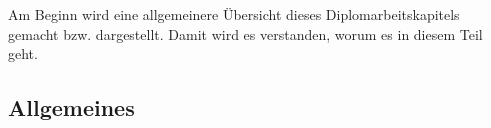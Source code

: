 \chapter{\docname}
\label{\docname}
Am Beginn wird eine allgemeinere Übersicht dieses Diplomarbeitskapitels gemacht bzw. dargestellt. Damit wird es verstanden, worum es in diesem Teil geht.
\section{Allgemeines}


